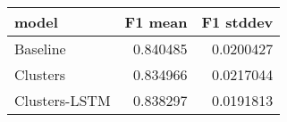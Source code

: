 \begin{tabular}{lrr}
\toprule
 model         &   F1 mean &   F1 stddev \\
\midrule
 Baseline      &  0.840485 &   0.0200427 \\
 Clusters      &  0.834966 &   0.0217044 \\
 Clusters-LSTM &  0.838297 &   0.0191813 \\
\bottomrule
\end{tabular}